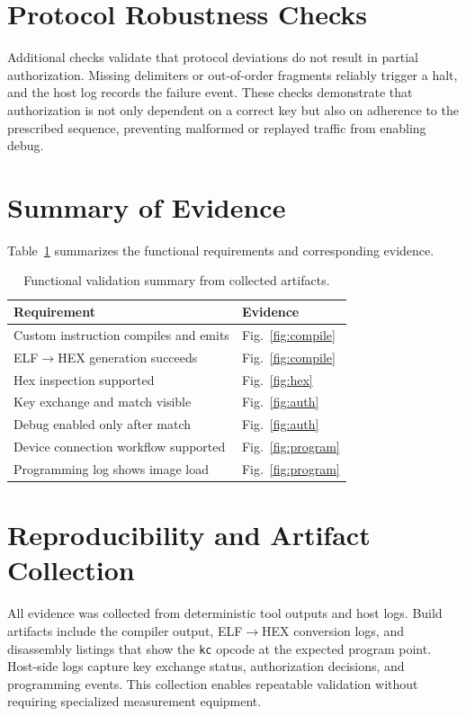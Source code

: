 \section{Protocol Robustness Checks}
Additional checks validate that protocol deviations do not result in partial authorization.
Missing delimiters or out-of-order fragments reliably trigger a halt, and the host log records
the failure event. These checks demonstrate that authorization is not only dependent on a
correct key but also on adherence to the prescribed sequence, preventing malformed or replayed
traffic from enabling debug.

\section{Summary of Evidence}
Table~\ref{tab:thesis-results} summarizes the functional requirements and corresponding evidence.

\begin{table}[t]
  \centering
  \caption{Functional validation summary from collected artifacts.}
  \label{tab:thesis-results}
  \begin{tabular}{@{}ll@{}}
    \toprule
    \textbf{Requirement} & \textbf{Evidence} \\
    \midrule
    Custom instruction compiles and emits & Fig.~\ref{fig:compile} \\
    ELF$\rightarrow$HEX generation succeeds & Fig.~\ref{fig:compile} \\
    Hex inspection supported & Fig.~\ref{fig:hex} \\
    Key exchange and match visible & Fig.~\ref{fig:auth} \\
    Debug enabled only after match & Fig.~\ref{fig:auth} \\
    Device connection workflow supported & Fig.~\ref{fig:program} \\
    Programming log shows image load & Fig.~\ref{fig:program} \\
    \bottomrule
  \end{tabular}
\end{table}

\section{Reproducibility and Artifact Collection}
All evidence was collected from deterministic tool outputs and host logs. Build artifacts
include the compiler output, ELF$\rightarrow$HEX conversion logs, and disassembly listings that
show the \texttt{kc} opcode at the expected program point. Host-side logs capture key exchange
status, authorization decisions, and programming events. This collection enables repeatable
validation without requiring specialized measurement equipment.

